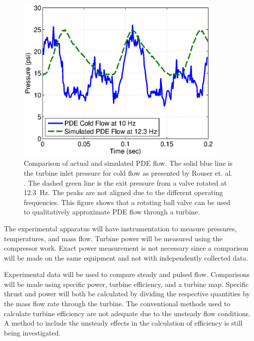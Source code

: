 \documentclass[12pt, letterpaper]{article}
\begin{document}
\begin{figure}[htbp] %
   \centering
   \includegraphics[trim = 0mm 0mm 0mm 0mm,clip,width=4in]{pressure.eps}
   \caption{Comparison of actual and simulated PDE flow. The solid blue line is the turbine inlet pressure for cold flow as presented by Rouser et. al. \cite{Rouser2010:Unsteady}. The dashed green line is the exit pressure from a valve rotated at 12.3~Hz. The peaks are not aligned due to the different operating frequencies. This figure shows that a rotating ball valve can be used to qualitatively approximate PDE flow through a turbine.}
   \label{fig:pressurecomparison}
\end{figure}

The experimental apparatus will have instrumentation to measure pressures, temperatures, and mass flow.
Turbine power will be measured using the compressor work. Exact power measurement is not necessary since a comparison will be made on the same equipment and not with independently collected data.

Experimental data will be used to compare steady and pulsed flow. Comparisons will be made using specific power, turbine efficiency, and a turbine map. Specific thrust and power will both be calculated by dividing the respective quantities by the mass flow rate through the turbine. The conventional methods used to calculate turbine efficiency are not adequate due to the unsteady flow conditions. A method to include the unsteady effects in the calculation of efficiency is still being investigated.
\end{document}
